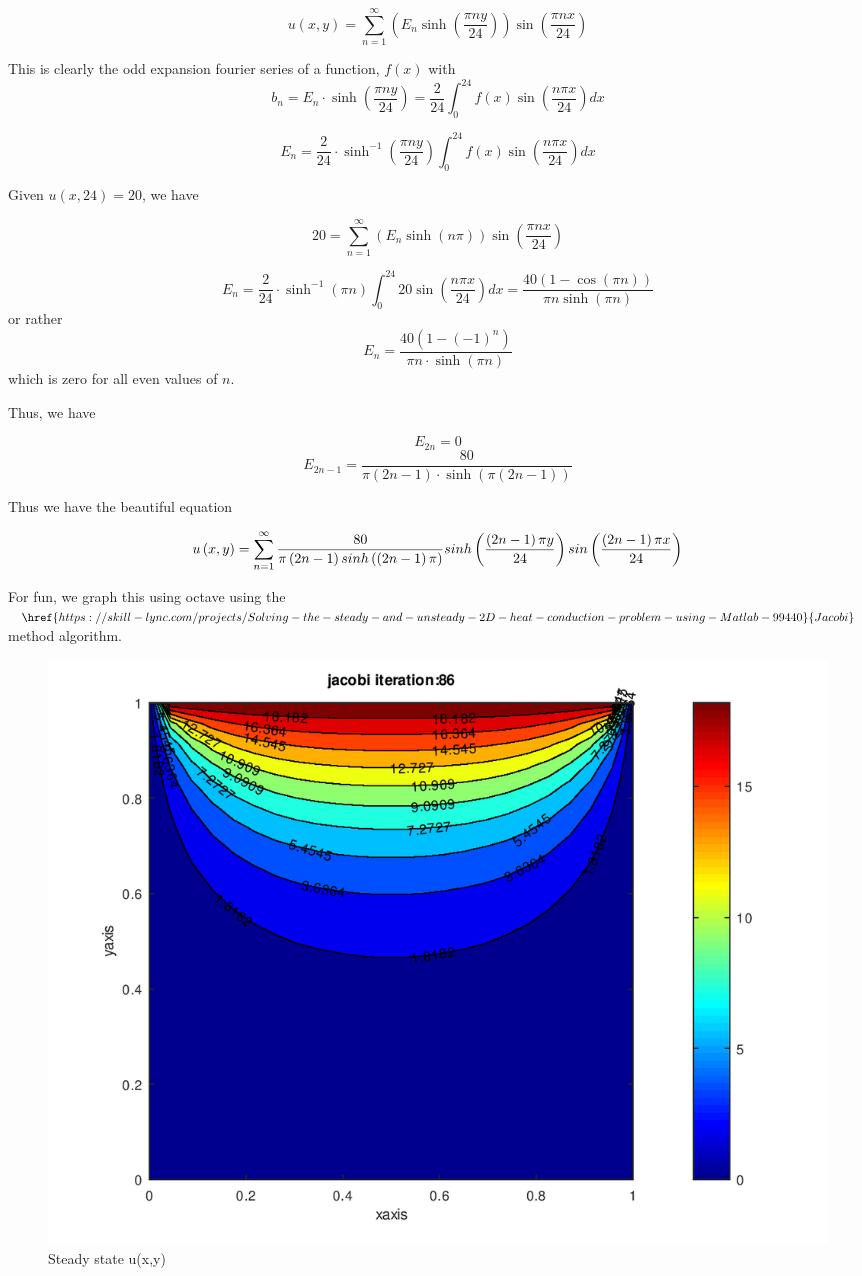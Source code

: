 \documentclass{article}
\begin{document}
$$u(x,y) = \sum_{n=1}^{\infty} \left( E_n \sinh\left(\frac{\pi n y}{24}\right)\right)\sin\left(\frac{\pi n x}{24}\right)$$


This is clearly the odd expansion fourier series of a function, $f(x)$ with
$$b_n = E_n \cdot \sinh\left(\frac{\pi n y}{24}\right) = \frac{2}{24} \int_0^{24} f(x) \sin\left(\frac{n \pi x}{24}\right) dx$$

$$E_n = \frac{2}{24} \cdot \sinh^{-1}\left(\frac{\pi n y}{24}\right) \int_0^{24} f(x) \sin\left(\frac{n \pi x}{24}\right) dx$$



Given $u(x,24) = 20$, we have

$$20 = \sum_{n=1}^{\infty} \left( E_n \sinh(n \pi)\right)\sin\left(\frac{\pi n x}{24}\right)$$

$$E_n = \frac{2}{24} \cdot \sinh^{-1}\left(\pi n\right) \int_0^{24} 20 \sin\left(\frac{n \pi x}{24}\right) dx =  \frac{40(1-\cos(\pi n))}{\pi n\sinh(\pi n)}$$
or rather
$$E_n = \frac{40(1-(-1)^n)}{\pi n \cdot \sinh(\pi n)}$$
which is zero for all even values of $n$.

Thus, we have

$$E_{2n} = 0$$
$$E_{2n-1} = \frac{80}{\pi (2n-1) \cdot \sinh(\pi (2n-1))}$$


Thus we have the beautiful equation

$$u\left(x,y\right)=\sum_{n=1}^{\infty}\frac{80}{\pi\left(2n-1\right)\\sinh\left(\left(2n-1\right)\pi\right)}\\sinh\left(\frac{\left(2n-1\right)\pi y}{24}\right)\\sin\left(\frac{\left(2n-1\right)\pi x}{24}\right)$$

For fun, we graph this using octave using the $\href{https://skill-lync.com/projects/Solving-the-steady-and-unsteady-2D-heat-conduction-problem-using-Matlab-99440}{Jacobi}$ method algorithm.

\begin{figure}
\includegraphics[width=1.0\textwidth]{./static/Jacobi.png}
\caption{Steady state u(x,y)}
\end{figure}
\end{document}

